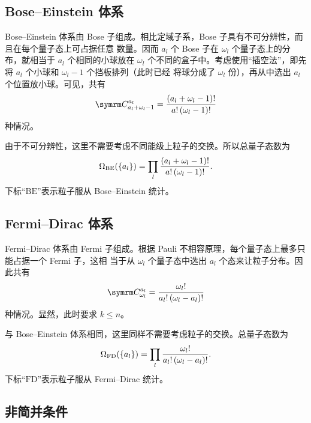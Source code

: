 \subsection{Bose--Einstein 体系}

Bose--Einstein 体系由 Bose 子组成。相比定域子系，Bose 子具有不可分辨性，而且在每个量子态上可占据任意
数量。因而 $a_l$ 个 Bose 子在 $\omega_l$ 个量子态上的分布，就相当于 $a_l$ 个相同的小球放在
$\omega_l$ 个不同的盒子中。考虑使用“插空法”，即先将 $a_l$ 个小球和 $\omega_l-1$ 个挡板排列（此时已经
将球分成了 $\omega_l$ 份），再从中选出 $a_l$ 个位置放小球。可见，共有
\begin{equation}
  \Cnum{a_l+\omega_l-1}{a_l} = \frac{\qty(a_l+\omega_l-1)!}{a! \, \qty(\omega_l-1)!}
\end{equation}
种情况。

由于不可分辨性，这里不需要考虑不同能级上粒子的交换。所以总量子态数为
\begin{equation}
  \Omega_\text{BE}(\qty{a_l}) = \prod_l \frac{\qty(a_l+\omega_l-1)!}{a! \, \qty(\omega_l-1)!}.
\end{equation}
下标“$\text{BE}$”表示粒子服从 Bose--Einstein 统计。

\subsection{Fermi--Dirac 体系}

Fermi--Dirac 体系由 Fermi 子组成。根据 Pauli 不相容原理，每个量子态上最多只能占据一个 Fermi 子，这相
当于从 $\omega_l$ 个量子态中选出 $a_l$ 个态来让粒子分布。因此共有
\begin{equation}
  \Cnum{\omega_l}{a_l} = \frac{\omega_l!}{a_l! \, \qty(\omega_l-a_l)!}
\end{equation}
种情况。显然，此时要求 $k \leqslant n$。

与 Bose--Einstein 体系相同，这里同样不需要考虑粒子的交换。总量子态数为
\begin{equation}
  \Omega_\text{FD}(\qty{a_l}) = \prod_l \frac{\omega_l!}{a_l! \, \qty(\omega_l-a_l)!}.
\end{equation}
下标“$\text{FD}$”表示粒子服从 Fermi--Dirac 统计。

\subsection{非简并条件}

